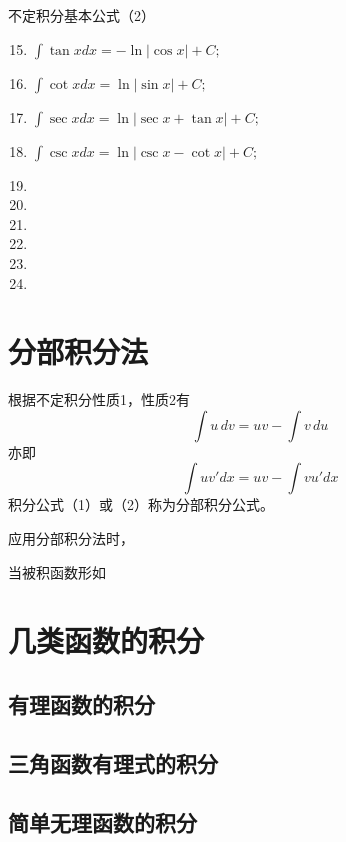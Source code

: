 \noindent 不定积分基本公式（2）
\begin{enumerate}
    \setcounter{enumi}{14}
    \item $\int\tan xdx=-\ln|\cos x|+C;$
    \item $\int\cot xdx=\ln|\sin x|+C;$
    \item $\int\sec xdx=\ln|\sec x+\tan x|+C;$
    \item $\int\csc xdx=\ln|\csc x-\cot x|+C;$
    \item 
    \item 
    \item 
    \item 
    \item 
    \item 
\end{enumerate}

\section{分部积分法}
根据不定积分性质1，性质2有
\[
\int u\,dv=uv-\int v\,du \tag{1}
\]
亦即
\[
\int uv'dx=uv-\int vu'dx \tag{2}
\]
积分公式（1）或（2）称为分部积分公式。

应用分部积分法时，

当被积函数形如

\section{几类函数的积分}
\subsection{有理函数的积分}

\subsection{三角函数有理式的积分}

\subsection{简单无理函数的积分}